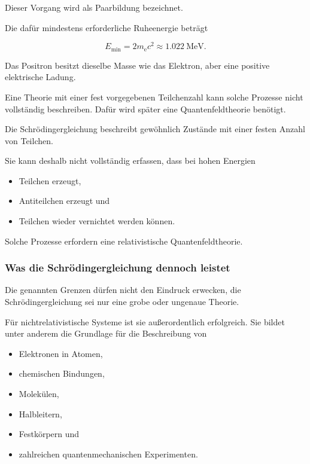 Dieser Vorgang wird als Paarbildung%
 bezeichnet.

Die dafür mindestens erforderliche Ruheenergie beträgt

\begin{equation}
	E_{\mathrm{min}}
	=
	2m_{\mathrm e}c^2
	\approx
	\SI{1.022}{\mega\electronvolt}.
	\label{eq:mindestenergie_paarbildung}
\end{equation}

Das Positron besitzt dieselbe Masse wie das Elektron,
aber eine positive elektrische Ladung.

Eine Theorie mit einer fest vorgegebenen Teilchenzahl kann solche
Prozesse nicht vollständig beschreiben. Dafür wird später eine
Quantenfeldtheorie%
 benötigt.

\begin{PhysicsBox}
	\label{box:feste_teilchenzahl_schroedinger}
	
	Die Schrödingergleichung beschreibt gewöhnlich Zustände mit einer
	festen Anzahl von Teilchen.
	
	Sie kann deshalb nicht vollständig erfassen, dass bei hohen Energien
	
	\begin{itemize}
		\item Teilchen erzeugt,
		\item Antiteilchen erzeugt und
		\item Teilchen wieder vernichtet werden können.
	\end{itemize}
	
	Solche Prozesse erfordern eine relativistische Quantenfeldtheorie.
\end{PhysicsBox}

\subsubsection*{Was die Schrödingergleichung dennoch leistet}

Die genannten Grenzen dürfen nicht den Eindruck erwecken, die
Schrödingergleichung sei nur eine grobe oder ungenaue Theorie.

Für nichtrelativistische Systeme ist sie außerordentlich erfolgreich.
Sie bildet unter anderem die Grundlage für die Beschreibung von

\begin{itemize}
	\item Elektronen in Atomen,
	\item chemischen Bindungen,
	\item Molekülen,
	\item Halbleitern,
	\item Festkörpern und
	\item zahlreichen quantenmechanischen Experimenten.
\end{itemize}

